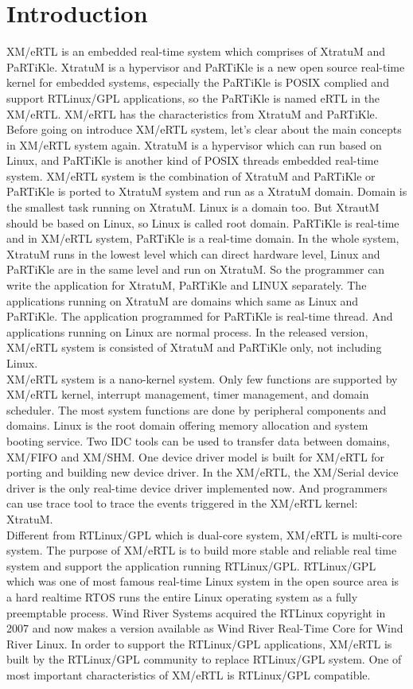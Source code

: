 \section{Introduction}
XM/eRTL is an embedded real-time system which comprises of XtratuM and PaRTiKle. XtratuM is a hypervisor and PaRTiKle is a new open source real-time kernel for embedded systems, especially the PaRTiKle is POSIX complied and support RTLinux/GPL applications, so the PaRTiKle is named eRTL in the XM/eRTL. XM/eRTL has the characteristics from XtratuM and PaRTiKle. 
\\
Before going on introduce XM/eRTL system, let's clear about the main concepts in XM/eRTL system again. XtratuM is a hypervisor which can run based on Linux, and PaRTiKle is another kind of POSIX threads embedded real-time system. XM/eRTL system is the combination of XtratuM and PaRTiKle or PaRTiKle is ported to XtratuM system and run as a XtratuM domain. Domain is the smallest task running on XtratuM. Linux is a domain too. But XtrautM should be based on Linux, so Linux is called root domain. PaRTiKle is real-time and in XM/eRTL system, PaRTiKle is a real-time domain. In the whole system, XtratuM runs in the lowest level which can direct hardware level, Linux and PaRTiKle are in the same level and run on XtratuM. So the programmer can write the application for XtratuM, PaRTiKle and LINUX separately. The applications running on XtratuM are domains which same as Linux and PaRTiKle. The application programmed for PaRTiKle is real-time thread. And applications running on Linux are normal process. In the released version, XM/eRTL system is consisted of XtratuM and PaRTiKle only, not including Linux.  
\\
XM/eRTL system is a nano-kernel system. Only few functions are supported by XM/eRTL kernel, interrupt management, timer management, and domain scheduler. The most system functions are done by peripheral components and domains. Linux is the root domain offering memory allocation and system booting service. Two IDC tools can be used to transfer data between domains, XM/FIFO and XM/SHM. One device driver model is built for XM/eRTL for porting and building new device driver. In the XM/eRTL, the XM/Serial device driver is the only real-time device driver implemented now. And programmers can use trace tool to trace the events triggered in the XM/eRTL kernel: XtratuM.
\\
Different from RTLinux/GPL which is dual-core system, XM/eRTL is multi-core system. The purpose of XM/eRTL is to build more stable and reliable real time system and support the application running RTLinux/GPL. RTLinux/GPL which was one of most famous real-time Linux system in the open source area is a hard realtime RTOS runs the entire Linux operating system as a fully preemptable process. Wind River Systems acquired the RTLinux copyright in 2007 and now makes a version available as Wind River Real-Time Core for Wind River Linux. In order to support the RTLinux/GPL applications, XM/eRTL is built by the RTLinux/GPL community to replace RTLinux/GPL system. One of most important characteristics of XM/eRTL is RTLinux/GPL compatible.
